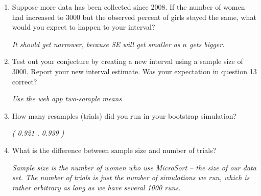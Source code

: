 \begin{enumerate}
\begin{enumerate}
         \item  Suppose more data has been collected since 2008. If
           the number of women had increased to 3000 but the observed
           percent of girls stayed the same, what would you expect to
           happen to your interval? 
\begin{students}
          \vspace{2cm}
\end{students}
\begin{key}
 {\it It should get narrower, because SE will get smaller as $n$ gets bigger. }      
\end{key}

         \item  Test out your conjecture by creating a new interval
           using a sample size of 3000. Report your new interval
           estimate. Was your expectation in question 13 correct?

\begin{students}
          \vspace{2cm}
\end{students}
\begin{key}
 {\it Use the web app two-sample means }      
\end{key} 

         \item  How many resamples (trials) did you run in your bootstrap
           simulation? 
\begin{students}
          \vspace{3cm}
\end{students}
\begin{key}
 {\it ( 0.921 , 0.939 ) }      
\end{key}

         \item  What is the difference between sample size and number
           of trials? 
\begin{students}
        \vspace{4cm}
\end{students}
\begin{key}
 {\it  Sample size is the number of women who use MicroSort -- the
   size of our data set.  The number of trials is just the number of
   simulations we run, which is rather arbitrary as long as we have
   several 1000 runs.}      
\end{key}

         \end{enumerate}
         

\end{enumerate}
